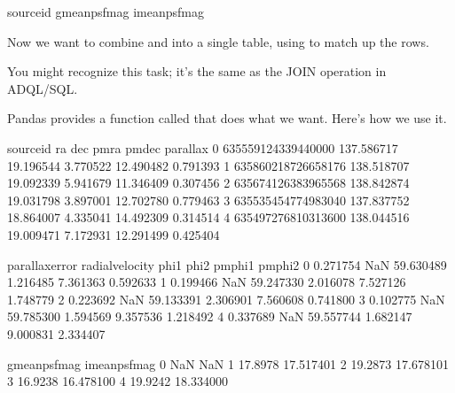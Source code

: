\documentclass[letterpaper,10pt,english]{sphinxmanual}
\begin{document}
\begin{sphinxVerbatim}[commandchars=\\\{\}]
source\PYGZus{}id
g\PYGZus{}mean\PYGZus{}psf\PYGZus{}mag
i\PYGZus{}mean\PYGZus{}psf\PYGZus{}mag
\end{sphinxVerbatim}

Now we want to combine  and  into a single table, using  to match up the rows.

You might recognize this task; it’s the same as the JOIN operation in ADQL/SQL.

Pandas provides a function called  that does what we want.  Here’s how we use it.

\begin{sphinxVerbatim}[commandchars=\\\{\}]
   
\end{sphinxVerbatim}

\begin{sphinxVerbatim}[commandchars=\\\{\}]
            source\PYGZus{}id          ra        dec      pmra      pmdec  parallax  \PYGZbs{}
0  635559124339440000  137.586717  19.196544 \PYGZhy{}3.770522 \PYGZhy{}12.490482  0.791393   
1  635860218726658176  138.518707  19.092339 \PYGZhy{}5.941679 \PYGZhy{}11.346409  0.307456   
2  635674126383965568  138.842874  19.031798 \PYGZhy{}3.897001 \PYGZhy{}12.702780  0.779463   
3  635535454774983040  137.837752  18.864007 \PYGZhy{}4.335041 \PYGZhy{}14.492309  0.314514   
4  635497276810313600  138.044516  19.009471 \PYGZhy{}7.172931 \PYGZhy{}12.291499  0.425404   

   parallax\PYGZus{}error  radial\PYGZus{}velocity       phi1      phi2   pm\PYGZus{}phi1   pm\PYGZus{}phi2  \PYGZbs{}
0        0.271754              NaN \PYGZhy{}59.630489 \PYGZhy{}1.216485 \PYGZhy{}7.361363 \PYGZhy{}0.592633   
1        0.199466              NaN \PYGZhy{}59.247330 \PYGZhy{}2.016078 \PYGZhy{}7.527126  1.748779   
2        0.223692              NaN \PYGZhy{}59.133391 \PYGZhy{}2.306901 \PYGZhy{}7.560608 \PYGZhy{}0.741800   
3        0.102775              NaN \PYGZhy{}59.785300 \PYGZhy{}1.594569 \PYGZhy{}9.357536 \PYGZhy{}1.218492   
4        0.337689              NaN \PYGZhy{}59.557744 \PYGZhy{}1.682147 \PYGZhy{}9.000831  2.334407   

   g\PYGZus{}mean\PYGZus{}psf\PYGZus{}mag  i\PYGZus{}mean\PYGZus{}psf\PYGZus{}mag  
0             NaN             NaN  
1         17.8978       17.517401  
2         19.2873       17.678101  
3         16.9238       16.478100  
4         19.9242       18.334000  
\end{sphinxVerbatim}
\end{document}
